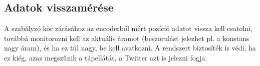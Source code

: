 \subsection{Adatok visszamérése}

A szabályzó kör zárásához az encoderből mért pozíció adatot vissza kell csatolni, továbbá monitorozni kell az aktuális áramot (beszorulást jelezhet pl. a konstans nagy áram), és ha ez túl nagy, be kell avatkozni. A rendszert biztosíték is védi, ha ez kiég, azaz megszűnik a tápellátás, a Twitter azt is jelezni fogja.

